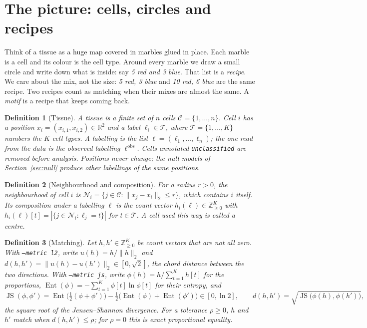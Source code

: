 \documentclass[11pt,a4paper]{article}
\newtheorem{definition}{Definition}[section]
\theoremstyle{remark}
\newcommand{\cells}{\mathcal{C}}
\newcommand{\types}{\mathcal{T}}
\newcommand{\lab}{\ell}
\newcommand{\obs}{\mathrm{obs}}
\newcommand{\Nb}[1]{\mathcal{N}_{#1}}
\newcommand{\Real}{\mathbb{R}}
\newcommand{\Nat}{\mathbb{Z}_{\ge 0}}
\newcommand{\JS}{\operatorname{JS}}
\begin{document}
\section{The picture: cells, circles and recipes}
\label{sec:data}

\begin{plain}
Think of a tissue as a huge map covered in marbles glued in place. Each marble
is a cell and its colour is the cell type. Around every marble we draw a small
circle and write down what is inside: say \emph{5 red and 3 blue}. That list is
a \emph{recipe}. We care about the mix, not the size: \emph{5 red, 3 blue} and
\emph{10 red, 6 blue} are the same recipe. Two recipes count as matching when
their mixes are almost the same. A \emph{motif} is a recipe that keeps coming
back.
\end{plain}

\begin{definition}[Tissue]
\label{def:tissue}
A tissue is a finite set of $n$ cells $\cells=\{1,\dots,n\}$. Cell $i$ has a
position $x_i=(x_{i,1},x_{i,2})\in\Real^2$ and a label $\lab_i\in\types$,
where $\types=\{1,\dots,K\}$ numbers the $K$ cell types. A \emph{labelling} is
the list $\lab=(\lab_1,\dots,\lab_n)$; the one read from the data is the
\emph{observed labelling} $\lab^{\obs}$. Cells annotated
\texttt{unclassified} are removed before analysis. Positions never change;
the null models of Section~\ref{sec:null} produce other labellings of the
same positions.
\end{definition}

\begin{definition}[Neighbourhood and composition]
\label{def:nbhd}
For a radius $r>0$, the neighbourhood of cell $i$ is
$\Nb{i}=\{j\in\cells:\lVert x_j-x_i\rVert_2\le r\}$, which contains $i$
itself. Its \emph{composition} under a labelling $\lab$ is the count vector
$h_i(\lab)\in\Nat^K$ with $h_i(\lab)[t]=|\{j\in \Nb{i}:\lab_j=t\}|$ for
$t\in\types$. A cell used this way is called a \emph{centre}.
\end{definition}

\begin{definition}[Matching]
\label{def:match}
Let $h,h'\in\Nat^K$ be count vectors that are not all zero.
With \texttt{--metric l2}, write $u(h)=h/\lVert h\rVert_2$ and
$d(h,h')=\lVert u(h)-u(h')\rVert_2\in[0,\sqrt2]$, the chord distance between
the two directions. With \texttt{--metric js}, write
$\phi(h)=h/\sum_{t=1}^K h[t]$ for the proportions,
$\operatorname{Ent}(\phi)=-\sum_{t=1}^K\phi[t]\ln\phi[t]$ for their entropy, and
\[
  \JS(\phi,\phi')=\operatorname{Ent}\bigl(\tfrac12(\phi+\phi')\bigr)-\tfrac12\bigl(\operatorname{Ent}(\phi)+\operatorname{Ent}(\phi')\bigr)\in[0,\ln2],
  \qquad
  d(h,h')=\sqrt{\JS\bigl(\phi(h),\phi(h')\bigr)},
\]
the square root of the Jensen--Shannon divergence. For a tolerance
$\rho\ge0$, $h$ and $h'$ \emph{match} when $d(h,h')\le\rho$; for $\rho=0$
this is exact proportional equality.
\end{definition}
\end{document}
